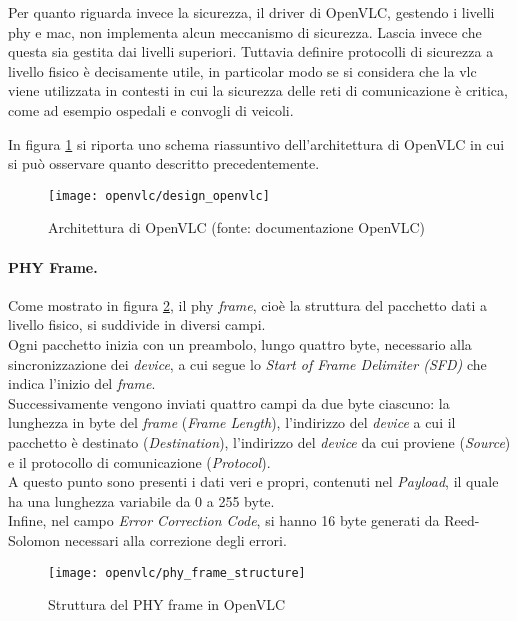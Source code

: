 Per quanto riguarda invece la sicurezza, il driver di OpenVLC, gestendo i livelli \gls{phy} e \gls{mac}, non implementa alcun meccanismo di sicurezza. Lascia invece che questa sia gestita dai livelli superiori. Tuttavia definire protocolli di sicurezza a livello fisico è decisamente utile, in particolar modo se si considera che la \gls{vlc} viene utilizzata in contesti in cui la sicurezza delle reti di comunicazione è critica, come ad esempio ospedali e convogli di veicoli.

In figura \ref{fig:design_openvlc} si riporta uno schema riassuntivo dell'architettura di OpenVLC in cui si può osservare quanto descritto precedentemente.
\begin{figure}[H] 
    \centering 
    \texttt{[image: openvlc/design\_openvlc]}
    \caption{Architettura di OpenVLC (fonte: documentazione OpenVLC)}
    \label{fig:design_openvlc}
\end{figure}

\paragraph{PHY Frame.}

Come mostrato in figura \ref{fig:phy_frame_structure}, il \gls{phy} \textit{frame}, cioè la struttura del pacchetto dati a livello fisico, si suddivide in diversi campi.\\
Ogni pacchetto inizia con un preambolo, lungo quattro byte, necessario alla sincronizzazione dei \textit{device}, a cui segue lo \textit{Start of Frame Delimiter (SFD)} che indica l'inizio del \textit{frame}.\\
Successivamente vengono inviati quattro campi da due byte ciascuno: la lunghezza in byte del \textit{frame} (\textit{Frame Length}), l'indirizzo del \textit{device} a cui il pacchetto è destinato (\textit{Destination}), l'indirizzo del \textit{device} da cui proviene (\textit{Source}) e il protocollo di comunicazione (\textit{Protocol}).\\
A questo punto sono presenti i dati veri e propri, contenuti nel \textit{Payload}, il quale ha una lunghezza variabile da 0 a 255 byte.\\
Infine, nel campo \textit{Error Correction Code}, si hanno 16 byte generati da Reed-Solomon necessari alla correzione degli errori.
\begin{figure}[H] 
    \centering 
    \texttt{[image: openvlc/phy\_frame\_structure]}
    \caption{Struttura del PHY frame in OpenVLC}
    \label{fig:phy_frame_structure}
\end{figure}

